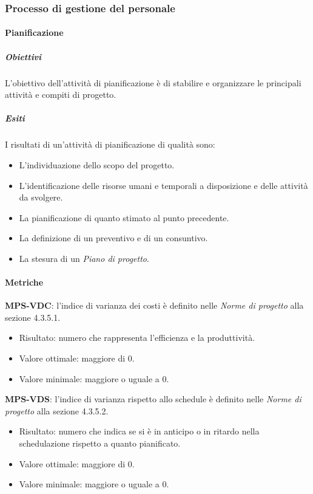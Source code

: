 \documentclass[../piano-di-qualifica.tex]{subfiles}
\begin{document}
\subsubsection{Processo di gestione del personale}%
\label{subs:processo_di_gestione_del_personale}

\paragraph{Pianificazione}%
\label{par:pianificazione}

\subparagraph{Obiettivi}%
\label{subp:obiettivi}
L'obiettivo dell'attività di pianificazione è di stabilire e organizzare le principali attività e compiti di progetto.

\subparagraph{Esiti}%
\label{subp:esiti}
I risultati di un'attività di pianificazione di qualità sono:
\begin{itemize}
  \item L'individuazione dello scopo del progetto.
  \item L'identificazione delle risorse umani e temporali a disposizione e delle attività da svolgere.
  \item La pianificazione di quanto stimato al punto precedente.
  \item La definizione di un preventivo e di un consuntivo.
  \item La stesura di un \textit{Piano di progetto}.
\end{itemize}

\paragraph{Metriche}%
\label{par:metriche}

\textbf{MPS-VDC}: l'indice di varianza dei costi è definito nelle \textit{Norme di progetto} alla sezione 4.3.5.1.
\begin{itemize}
  \item Risultato: numero che rappresenta l'efficienza e la produttività.
  \item Valore ottimale: maggiore di 0.
  \item Valore minimale: maggiore o uguale a 0.
\end{itemize}

\textbf{MPS-VDS}: l'indice di varianza rispetto allo schedule è definito nelle \textit{Norme di progetto} alla sezione 4.3.5.2.
\begin{itemize}
  \item Risultato: numero che indica se si è in anticipo o in ritardo nella schedulazione rispetto a quanto pianificato.
  \item Valore ottimale: maggiore di 0.
  \item Valore minimale: maggiore o uguale a 0.
\end{itemize}
\end{document}
